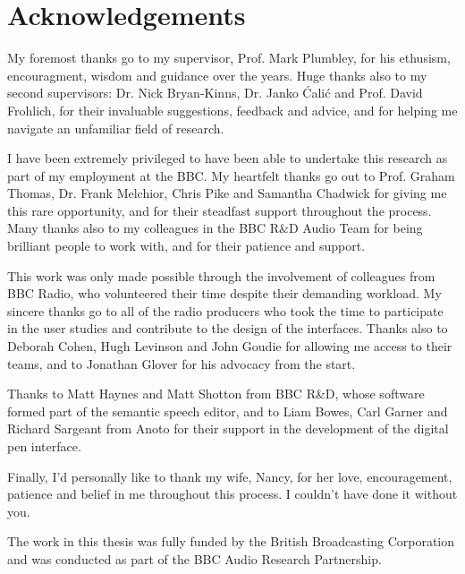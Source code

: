 \chapter*{Acknowledgements}

My foremost thanks go to my supervisor, Prof. Mark Plumbley, for his ethusism, encouragment, wisdom and guidance over
the years. Huge thanks also to my second supervisors: Dr. Nick Bryan-Kinns, Dr. Janko \'{C}ali\'{c} and Prof.  David
Frohlich, for their invaluable suggestions, feedback and advice, and for helping me navigate an unfamiliar field of
research.

I have been extremely privileged to have been able to undertake this research as part of my employment at the BBC.  My
heartfelt thanks go out to Prof. Graham Thomas, Dr. Frank Melchior, Chris Pike and Samantha Chadwick for giving me this
rare opportunity, and for their steadfast support throughout the process.  Many thanks also to my colleagues in the BBC
R\&D Audio Team for being brilliant people to work with, and for their patience and support.

This work was only made possible through the involvement of colleagues from BBC Radio, who volunteered their time
despite their demanding workload. My sincere thanks go to all of the radio producers who took the time to participate
in the user studies and contribute to the design of the interfaces. Thanks also to Deborah Cohen, Hugh Levinson and
John Goudie for allowing me access to their teams, and to Jonathan Glover for his advocacy from the start.

Thanks to Matt Haynes and Matt Shotton from BBC R\&D, whose software formed part of the semantic speech editor, and to
Liam Bowes, Carl Garner and Richard Sargeant from Anoto for their support in the development of the digital pen
interface. 

Finally, I'd personally like to thank my wife, Nancy, for her love, encouragement, patience and belief in me throughout
this process. I couldn't have done it without you.

\vfill
\noindent
The work in this thesis was fully funded by the British Broadcasting Corporation and was conducted as part of the BBC
Audio Research Partnership.
